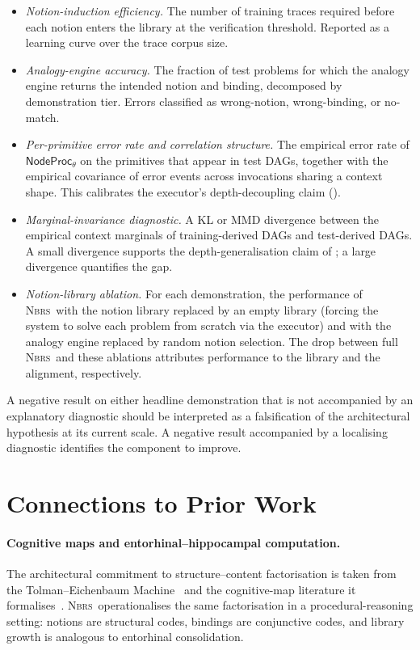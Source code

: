 \documentclass[11pt,a4paper]{article}
\theoremstyle{plain}
\theoremstyle{definition}
\theoremstyle{remark}
\newcommand{\NBRS}{\textsc{Nbrs}}
\newcommand{\NodeProc}{\mathsf{NodeProc}}
\begin{document}
\begin{itemize}[topsep=2pt,itemsep=4pt]
  \item \emph{Notion-induction efficiency.} The number of training traces required before each notion enters the library at the verification threshold. Reported as a learning curve over the trace corpus size.
  \item \emph{Analogy-engine accuracy.} The fraction of test problems for which the analogy engine returns the intended notion and binding, decomposed by demonstration tier. Errors classified as wrong-notion, wrong-binding, or no-match.
  \item \emph{Per-primitive error rate and correlation structure.} The empirical error rate of $\NodeProc_\theta$ on the primitives that appear in test DAGs, together with the empirical covariance of error events across invocations sharing a context shape. This calibrates the executor's depth-decoupling claim ().
  \item \emph{Marginal-invariance diagnostic.} A KL or MMD divergence between the empirical context marginals of training-derived DAGs and test-derived DAGs. A small divergence supports the depth-generalisation claim of ; a large divergence quantifies the gap.
  \item \emph{Notion-library ablation.} For each demonstration, the performance of \NBRS\ with the notion library replaced by an empty library (forcing the system to solve each problem from scratch via the executor) and with the analogy engine replaced by random notion selection. The drop between full \NBRS\ and these ablations attributes performance to the library and the alignment, respectively.
\end{itemize}

A negative result on either headline demonstration that is not accompanied by an explanatory diagnostic should be interpreted as a falsification of the architectural hypothesis at its current scale. A negative result accompanied by a localising diagnostic identifies the component to improve.

\section{Connections to Prior Work}
\label{sec:related}

\paragraph{Cognitive maps and entorhinal--hippocampal computation.}
The architectural commitment to structure--content factorisation is taken from the Tolman--Eichenbaum Machine~\cite{whittington2020tem} and the cognitive-map literature it formalises~\cite{behrens2018cognitive, constantinescu2016conceptual, whittington2022disentanglement}. \NBRS\ operationalises the same factorisation in a procedural-reasoning setting: notions are structural codes, bindings are conjunctive codes, and library growth is analogous to entorhinal consolidation.
\end{document}

